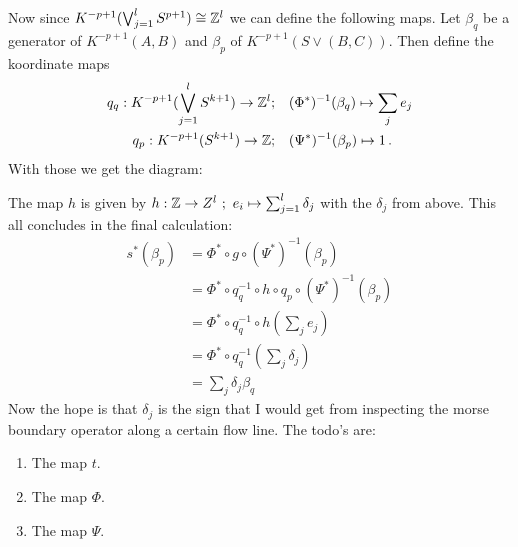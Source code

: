 \begin{cor}
	Now since  $K^{-p+1}(\bigvee _{j=1}^lS^{p+1})\cong \mathbb{Z}^l$ we can define the following maps. Let $\beta_q$ be a generator of $K^{-p+1}(A,B)$ and $\beta_p$ of $K^{-p+1}(S\vee (B,C))$. Then define the koordinate maps 
	\begin{align*}
		q_q: K^{-p+1}(\bigvee_{j=1}^l S^{k+1}) \to \mathbb{Z}^l;\quad & (\Phi^*)^{-1}(\beta_q)\mapsto \sum_j e_j \\
		q_p: K^{-p+1}(S^{k+1}) 				   \to \mathbb{Z}  ;\quad & (\Psi^*)^{-1}(\beta_p)\mapsto  1         \, . 
	\end{align*}
	With those we get the diagram: 
	\begin{center}
	\end{center}The map $h$ is given by $h:\mathbb{Z} \to Z^l~;~ e_i\mapsto \sum_{j=1}^{l} \delta_j$ with the $\delta_j$ from above.
	This all concludes in the final calculation: 
	\begin{align*}
		s^*(\beta_p) 
		&= \Phi^*\circ  g\circ (\Psi^*)^{-1}(\beta_p)\\
		&= \Phi^*\circ  q_q^{-1}\circ h \circ q_p \circ (\Psi^*)^{-1}(\beta_p)\\
		&= \Phi^*\circ  q_q^{-1}\circ h (\sum_j e_j)\\
		&= \Phi^*\circ  q_q^{-1} (\sum_j \delta_j )\\
		&= \sum_j \delta_j \beta_q
	\end{align*}
	Now the hope is that $\delta_j$ is the sign that I would get from inspecting the morse boundary operator along a certain flow line. 
	The todo's are:
	\begin{enumerate}
		\item The map $t$.
		\item The map $\Phi$.
		\item The map $\Psi$.

\end{enumerate}
\end{cor}
